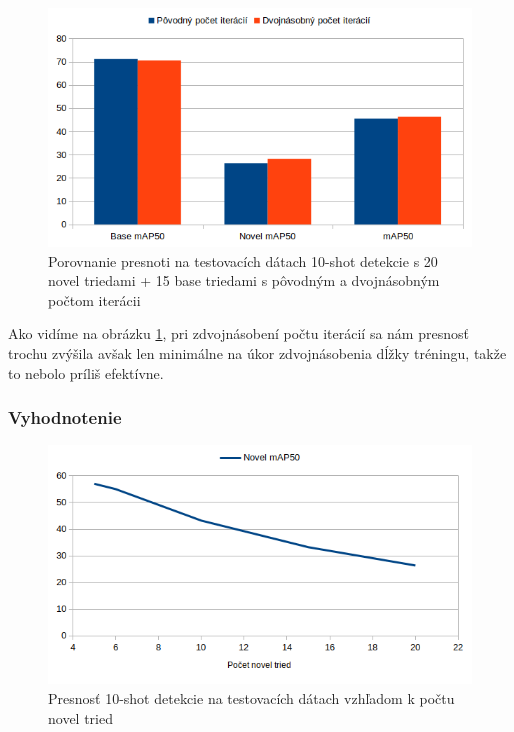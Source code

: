 \begin{figure}[H]
\centering
\includegraphics[width=\textwidth]{images/compare_20novel.png}
\caption{Porovnanie presnoti na testovacích dátach 10-shot detekcie s 20 novel triedami + 15 base triedami s pôvodným a dvojnásobným počtom iterácii}
\label{fig:image66}
\end{figure}

Ako vidíme na obrázku \ref{fig:image66}, pri zdvojnásobení počtu iterácií sa nám presnosť trochu zvýšila avšak len minimálne na úkor zdvojnásobenia dĺžky tréningu, takže to nebolo príliš efektívne.  

\subsubsection{Vyhodnotenie}

\begin{figure}[H]
\centering
\includegraphics[width=\textwidth]{images/more_novel_results.png}
\caption{Presnosť 10-shot detekcie na testovacích dátach vzhľadom k počtu novel tried}
\label{fig:image67}
\end{figure}

